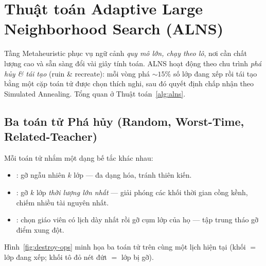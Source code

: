 \section{Thuật toán Adaptive Large Neighborhood Search (ALNS)}
\label{sec:alns}

Tầng Metaheuristic phục vụ ngữ cảnh \emph{quy mô lớn, chạy theo lô}, nơi cần chất
lượng cao và sẵn sàng đổi vài giây tính toán. ALNS hoạt động theo chu trình
\emph{phá hủy \& tái tạo} (ruin \& recreate): mỗi vòng phá $\sim 15\%$ số lớp đang
xếp rồi tái tạo bằng một cặp toán tử được chọn thích nghi, sau đó quyết định chấp
nhận theo Simulated Annealing. Tổng quan ở Thuật toán~\ref{alg:alns}.

\subsection{Ba toán tử Phá hủy (Random, Worst-Time, Related-Teacher)}
Mỗi toán tử nhắm một dạng bế tắc khác nhau:
\begin{itemize}
  \item {}: gỡ ngẫu nhiên $k$ lớp --- đa dạng hóa, tránh thiên kiến.
  \item {}: gỡ $k$ lớp \emph{thời lượng lớn nhất} --- giải phóng các
  khối thời gian cồng kềnh, chiếm nhiều tài nguyên nhất.
  \item {}: chọn giáo viên có lịch dày nhất rồi gỡ cụm lớp của
  họ --- tập trung tháo gỡ điểm xung đột.
\end{itemize}

Hình~\ref{fig:destroy-ops} minh họa ba toán tử trên cùng một lịch hiện tại (khối
$=$ lớp đang xếp; khối tô đỏ nét đứt $=$ lớp bị gỡ).

